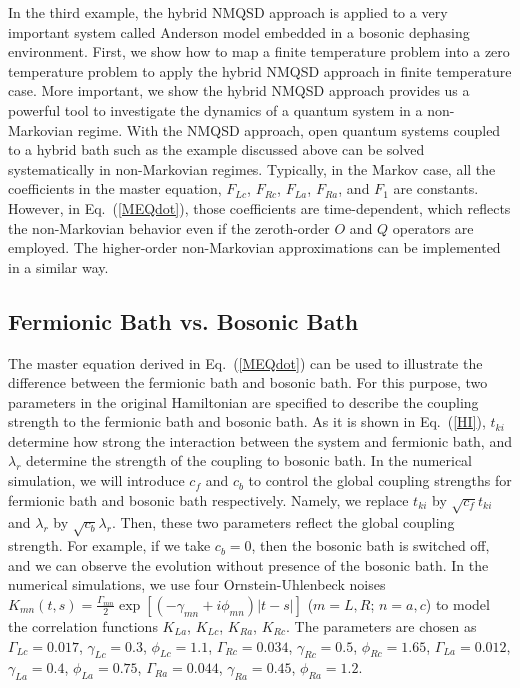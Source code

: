\documentclass[preprint]{elsarticle}
\begin{document}
In the third example, the hybrid NMQSD approach is applied to a very important  system called 
Anderson model embedded in a bosonic dephasing environment.
First, we show how to map a finite temperature problem into a zero
temperature problem to apply the hybrid NMQSD approach in finite temperature
case. More important, we show the hybrid NMQSD approach provides us
a powerful tool to investigate the dynamics of a quantum system in
a non-Markovian regime. With the NMQSD approach, open quantum systems
coupled to a hybrid bath such as the example discussed above can be solved systematically
in non-Markovian regimes. Typically, in the Markov case, all the coefficients
in the master equation, $F_{Lc}$, $F_{Rc}$, $F_{La}$, $F_{Ra}$,
and $F_{1}$ are constants. However, in Eq.~(\ref{MEQdot}), those
coefficients are time-dependent, which reflects the non-Markovian
behavior even if the zeroth-order $O$ and $Q$ operators are employed. The higher-order non-Markovian approximations
can be implemented in a similar way.


\subsection{Fermionic Bath vs. Bosonic Bath}

The master equation derived in Eq.~(\ref{MEQdot}) can be used to
illustrate the difference between the fermionic bath and bosonic bath.
For this purpose, two parameters in the original Hamiltonian are specified to describe the coupling
strength to the fermionic bath and bosonic bath. As it is shown in
Eq.~(\ref{HI}), $t_{ki}$ determine how strong the interaction between
the system and fermionic bath, and $\lambda_{r}$ determine the strength
of the coupling to bosonic bath. In the numerical simulation, we will
introduce $c_{f}$ and $c_{b}$ to control the global coupling strengths
for fermionic bath and bosonic bath respectively. Namely, we replace
$t_{ki}$ by $\sqrt{c_{f}}t_{ki}$ and $\lambda_{r}$ by $\sqrt{c_{b}}\lambda_{r}$.
Then, these two parameters reflect the global coupling strength.
For example, if we take $c_{b}=0$, then the bosonic bath is switched 
off, and we can observe the evolution without presence of the bosonic
bath. In the numerical simulations, we use four Ornstein-Uhlenbeck
noises $K_{mn}(t,s)=\frac{\Gamma_{mn}}{2}\exp[(-\gamma_{mn}+i\phi_{mn})|t-s|]$
($m=L,R$; $n=a,c$) to model the correlation functions $K_{La}$,
$K_{Lc}$, $K_{Ra}$, $K_{Rc}$. The parameters are chosen as $\Gamma_{Lc}=0.017$,
$\gamma_{Lc}=0.3$, $\phi_{Lc}=1.1$, $\Gamma_{Rc}=0.034$, $\gamma_{Rc}=0.5$,
$\phi_{Rc}=1.65$, $\Gamma_{La}=0.012$, $\gamma_{La}=0.4$, $\phi_{La}=0.75$,
$\Gamma_{Ra}=0.044$, $\gamma_{Ra}=0.45$, $\phi_{Ra}=1.2$.
\end{document}
